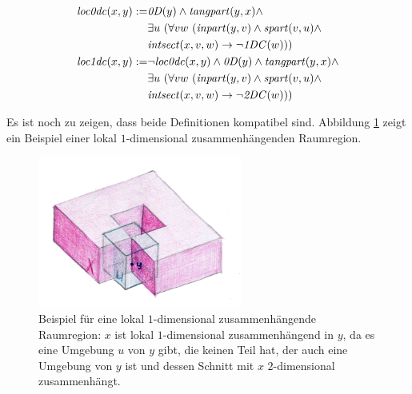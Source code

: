     \begin{dfn}
        \begin{align*}
            \Gloczerodc(x,y) := &\GzeroD(y) \land \Gtangpart(y,x) \land
                                \\
                                &\exists u\ (\forall v w\ (\Ginpart(y,v) \land \Gspart(v,u) \land
                                \\
                                &\Gintersect(x,v,w) \to \neg \GoneDC(w)))
                                \\
            \Gloconedc(x,y) := &\neg \Gloczerodc(x,y) \land \GzeroD(y) \land \Gtangpart(y,x) \land
                                \\
                                &\exists u\ (\forall v w\ (\Ginpart(y,v) \land \Gspart(v,u) \land
                                \\
                                &\Gintersect(x,v,w) \to \neg \GtwoDC(w)))
        \end{align*}

    \end{dfn}
%
    Es ist noch zu zeigen, dass beide Definitionen kompatibel sind.
    Abbildung \ref{fig:loc1dc} zeigt ein Beispiel einer lokal $1$-dimensional zusammenhängenden Raumregion.
%
    \begin{figure}[ht]
            \centering
            \includegraphics[width=0.6\textwidth]{abb/loc1dc.png}
            \caption[Beispiel für eine lokal $1$-dimensional zusammenhängende Raumregion]{Beispiel für eine lokal $1$-dimensional zusammenhängende Raumregion: $x$ ist lokal $1$-dimensional zusammenhängend in $y$, da es eine Umgebung $u$ von $y$ gibt, die keinen Teil hat, der auch eine Umgebung von $y$ ist und dessen Schnitt mit $x$ $2$-dimensional zusammenhängt.}
            \label{fig:loc1dc}
    \end{figure}
